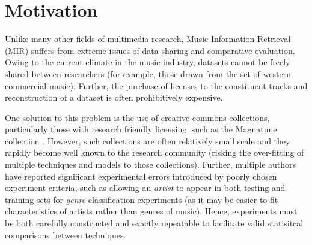 \documentclass[conference]{IEEEtran}
\begin{document}
%





\section{Motivation}
Unlike many other fields of multimedia research, Music Information Retrieval (MIR) suffers from extreme issues of data sharing and comparative evaluation. Owing to the current climate in the music industry, datasets cannot be freely shared between researchers (for example, those drawn from the set of western commercial music). Further, the purchase of licenses to the constituent tracks and reconstruction of a dataset is often prohibitively expensive. 

One solution to this problem is the use of creative commons collections, particularly those with research friendly licensing, such as the Magnatune collection \cite{magnatune}. However, such collections are often relatively small scale and they rapidly become well known to the research community (risking the over-fitting of multiple techniques and models to those collections). Further, multiple authors \cite{albumeffect,pampalk:thesis} have reported significant experimental errors introduced by poorly chosen experiment criteria, such as allowing an \emph{artist} to appear in both testing and training sets for \emph{genre} classification experiments (as it may be easier to fit characteristics of artists rather than genres of music). Hence, experiments must be both carefully constructed and exactly repeatable to facilitate valid statisitcal comparisons between techniques.
\end{document}
